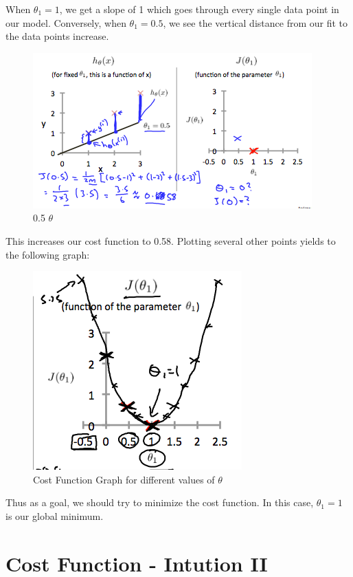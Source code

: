 \documentclass[
]{book}
\begin{document}
When \(\theta_1 = 1\), we get a slope of 1 which goes through every single data point in our model. Conversely, when \(\theta_1 = 0.5\), we see the vertical distance from our fit to the data points increase.

\begin{figure}
\centering
\includegraphics{thetapointfive.png}
\caption{0.5 \(\theta\)}
\end{figure}

This increases our cost function to 0.58. Plotting several other points yields to the following graph:

\begin{figure}
\centering
\includegraphics{cost_function_graph.png}
\caption{Cost Function Graph for different values of \(\theta\)}
\end{figure}

Thus as a goal, we should try to minimize the cost function. In this case, \(\theta_1 = 1\) is our global minimum.

\hypertarget{cost-function---intution-ii}{%
\section{Cost Function - Intution II}\label{cost-function---intution-ii}}
\end{document}

